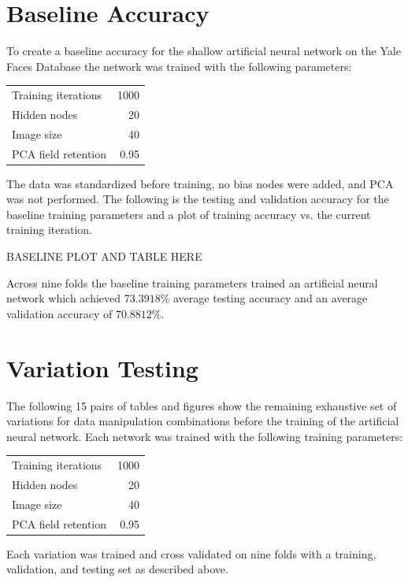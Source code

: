 \documentclass[12pt]{article}
\begin{document}
\section{Baseline Accuracy}
To create a baseline accuracy for the shallow artificial neural network on the Yale Faces Database the network was trained with the following parameters:
\begin{center}
  \begin{tabular}{l|r}
    \hline
    Training iterations & 1000 \\
    Hidden nodes & 20 \\
    Image size & 40 \\
    PCA field retention & 0.95 \\
    \hline
  \end{tabular}
\end{center}
\bigskip

The data was standardized before training, no bias nodes were added, and PCA was not performed. The following is the testing and validation accuracy for the baseline training parameters and a plot of training accuracy vs. the current training iteration.

BASELINE PLOT AND TABLE HERE

Across nine folds the baseline training parameters trained an artificial neural network which achieved $73.3918\%$ average testing accuracy and an average validation accuracy of $70.8812\%$.

\section{Variation Testing}
The following 15 pairs of tables and figures show the remaining exhaustive set of variations for data manipulation combinations before the training of the artificial neural network. Each network was trained with the following training parameters:

\begin{center}
  \begin{tabular}{l|r}
    \hline
    Training iterations & 1000 \\
    Hidden nodes & 20 \\
    Image size & 40 \\
    PCA field retention & 0.95 \\
    \hline
  \end{tabular}
\end{center}
\bigskip

Each variation was trained and cross validated on nine folds with a training, validation, and testing set as described above.
\end{document}
